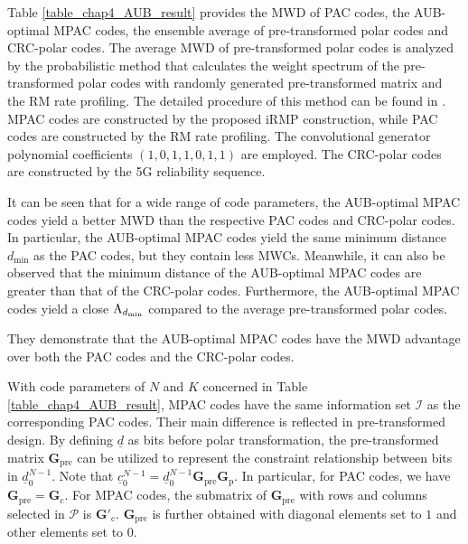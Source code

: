 \documentclass[12pt, draftclsnofoot, peerreview, onecolumn]{IEEEtran}
\theoremstyle{noparent}
\begin{document}
Table \ref{table_chap4_AUB_result} provides the MWD of PAC codes, the AUB-optimal MPAC codes, the ensemble average of pre-transformed polar codes \cite{Li2021WeightSpectrumPrea} and CRC-polar codes. The average MWD of pre-transformed polar codes is analyzed by the probabilistic method that calculates the weight spectrum of the pre-transformed polar codes with randomly generated pre-transformed matrix and the RM rate profiling.
The detailed procedure of this method can be found in \cite{Li2021WeightSpectrumPrea}.
MPAC codes are constructed by the proposed iRMP construction, while PAC codes are constructed by the RM rate profiling.
The convolutional generator polynomial coefficients $(1,0,1,1,0,1,1)$ are employed.
The CRC-polar codes are constructed by the 5G reliability sequence.





It can be seen that for a wide range of code parameters,
the AUB-optimal MPAC codes yield a better MWD than the respective PAC codes and CRC-polar codes.
In particular, the AUB-optimal MPAC codes yield the same minimum distance $d_{\min}$ as 
the PAC codes, but they contain less MWCs.
Meanwhile, it can also be observed that the minimum distance of the AUB-optimal MPAC codes are greater than
that of the CRC-polar codes. 
Furthermore, the AUB-optimal MPAC codes yield a close ${\rm A}_{d_{\min}}$ compared to the average pre-transformed polar codes.

They demonstrate that the AUB-optimal MPAC codes have the MWD advantage over both the PAC codes and the CRC-polar codes. 




With code parameters of $N$ and $K$ concerned in Table \ref{table_chap4_AUB_result}, MPAC codes have the same information set $\mathcal{I}$ as the corresponding PAC codes. Their main difference is reflected in pre-transformed design. By defining $\underline{d}$ as bits before polar transformation, the pre-transformed matrix $\mathbf{G}_{\mathrm{pre}}$ can be utilized to represent the constraint relationship between bits in $\underline{d}_{0}^{N-1}$. 
Note that $\underline{c}_{0}^{N-1}=\underline{d}_{0}^{N-1} \mathbf{G}_{\mathrm{pre}}\mathbf{G}_{\mathrm{p}}$. 
In particular, for PAC codes, we have
$\mathbf{G}_{\mathrm{pre}}=\mathbf{G}_{\mathrm{c}}$. 
For MPAC codes, the submatrix of $\mathbf{G}_{\mathrm{pre}}$ with rows and columns selected in $\mathcal{P}$ is $\mathbf{G}'_{\mathrm{c}}$. $\mathbf{G}_{\mathrm{pre}}$ is further obtained with diagonal elements set to $1$ and other elements set to $0$.
\end{document}
